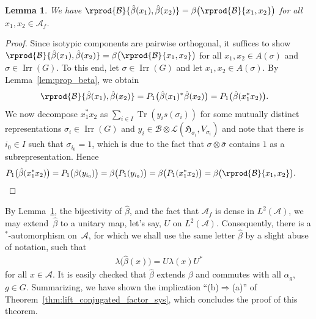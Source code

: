 \documentclass[10pt,a4paper]{amsart}
\numberwithin{equation}{section}
\newtheorem{Lemma}[Theorem]{Lemma}
\newcommand*{\tensor}{\otimes}		%
\DeclareMathOperator{\Tr}{Tr}		%
\newcommand*{\Star}{$^*$\nobreakdash}
\newcommand*{\hilb}{\mathfrak}		%
\newcommand*{\alg}{\mathcal}		%
\newcommand*{\hH}{\hilb{H}}			%
\newcommand*{\aA}{\alg{A}}			%
\newcommand*{\aB}{\alg{B}} 			%
\newcommand*{\End}{\mathcal{L}} %
\DeclareMathOperator{\Irrep}{Irr} 			%
\begin{document}
\begin{Lemma}\label{lem:beta_iso}
	We have $\rprod{\aB}{\hat\beta(x_1), \hat\beta(x_2)} = \beta\bigl( \rprod{\aB}{x_1, x_2} \bigr)$ for all $x_1, x_2 \in \aA_f$.
\end{Lemma}
\begin{proof}
	Since isotypic components are pairwise orthogonal, it suffices to show $\rprod{\aB}{\hat\beta(x_1), \hat\beta(x_2)} \allowbreak = \beta\bigl( \rprod{\aB}{x_1, x_2} \bigr)$ for all $x_1, x_2 \in A(\sigma)$ and $\sigma \in \Irrep(G)$.
	To this end, let $\sigma \in \Irrep(G)$ and let $x_1, x_2 \in A(\sigma)$.
	By Lemma~\ref{lem:prop_beta}, we obtain
	\begin{align*}
		\rprod{\aB}{\hat\beta(x_1), \hat\beta(x_2)}
		&=
		P_1\big( \hat\beta(x_1)^*\hat\beta(x_2) \big)
		=
		P_1\big( \hat\beta(x_1^*x_2) \big).
	\end{align*}
	We now decompose $x_1^*x_2$ as $\sum_{i \in I} \Tr( y_i s(\sigma_i) )$ for some mutually distinct representations $\sigma_i \in \Irrep(G)$ and $y_i \in \aB \tensor \End(\hH_{\sigma_i},V_{\sigma_i})$ and note that there is $i_0 \in I$ such that $\sigma_{i_0} = 1$, which is due to the fact that $\sigma \tensor \bar \sigma$ contains $1$ as a subrepresentation.
	Hence
	\begin{gather*}
		P_1\big( \hat\beta(x_1^*x_2) \big)
		=
		P_1\big( \beta(y_{i_0}) \big)
		=
		\beta\big( P_1(y_{i_0}) \big)
		=
		\beta\big( P_1(x_1^*x_2) \big)
		=
		\beta\bigl( \rprod{\aB}{x_1, x_2} \bigr).
		\tag*{\qed}
	\end{gather*}
	\renewcommand{\qed}{}
\end{proof}

By Lemma~\ref{lem:beta_iso}, the bijectivity of $\hat \beta$, and the fact that $\aA_f$ is dense in $L^2(\aA)$, we may extend~$\hat \beta$ to a unitary map, let's say, $U$ on $L^2(\aA)$.
Consequently, there is a \Star-automorphism on~$\aA$, for which we shall use the same letter $\hat \beta$ by a slight abuse of notation, such that
\begin{align*}
	\lambda\big( \hat \beta(x) \big) = U \lambda(x) U^*
\end{align*}
for all $x \in \aA$.
It is easily checked that $\hat \beta$ extends $\beta$ and commutes with all $\alpha_g$, $g\in G$.
Summarizing, we have shown the implication ``(b)$\Rightarrow$(a)'' of Theorem~\ref{thm:lift_conjugated_factor_sys}, which concludes the proof of this theorem.
\end{document}
